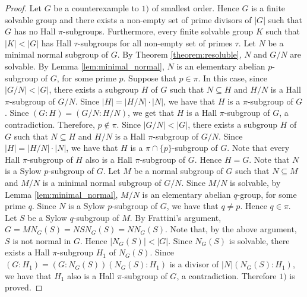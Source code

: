 \begin{proof}
    Let $G$ be a counterexample to $1)$ of smallest order. Hence $G$ is a finite solvable group and
    there exists a non-empty set of prime divisors of $|G|$ such that $G$ has no Hall $\pi$-subgroups. Furthermore, every finite solvable group $K$ such that $|K|<|G|$ has Hall $\tau$-subgroups for all non-empty set of primes $\tau$. Let $N$ be a minimal normal subgroup of $G$. By Theorem \ref{theorem:resoluble}, $N$ and $G/N$ are solvable. By Lemma \ref{lem:minimal_normal}, $N$ is an elementary abelian $p$-subgroup of $G$, for some prime $p$.
    Suppose that $p\in\pi$. In this case, since $|G/N|<|G|$, there exists a subgroup $H$ of $G$ such that $N\subseteq H$ and $H/N$ is a Hall $\pi$-subgroup
    of $G/N$. Since $|H|=|H/N|\cdot |N|$, we have that $H$ is a $\pi$-subgroup of $G$. Since $(G:H)=(G/N:H/N)$, we get that $H$ is a Hall $\pi$-subgroup of $G$, a contradiction. Therefore, $p\notin \pi$. Since $|G/N|<|G|$, there exists a subgroup $H$ of $G$ such that $N\subseteq H$ and $H/N$ is a Hall $\pi$-subgroup
    of $G/N$. Since $|H|=|H/N|\cdot |N|$, we have that $H$ is a $\pi\cap\{ p\}$-subgroup of $G$. Note that every Hall $\pi$-subgroup of $H$ also is a Hall $\pi$-subgroup of $G$. Hence $H=G$. Note that $N$ is a Sylow $p$-subgroup of $G$. Let $M$ be a normal subgroup of $G$ such that $N\subseteq M$ and $M/N$ is a minimal normal subgroup of $G/N$. Since $M/N$ is solvable, by Lemma \ref{lem:minimal_normal}, $M/N$ is an elementary abelian $q$-group, for some prime $q$. Since $N$ is a Sylow $p$-subgroup of $G$, we have that $q\neq p$. Hence $q\in \pi$. Let $S$ be a Sylow $q$-subgroup of $M$. By Frattini's argument, $G=MN_G(S)=NSN_G(S)=NN_G(S)$. Note that, by the above argument, $S$ is not normal in $G$. Hence $|N_G(S)|<|G|$. Since $N_G(S)$ is solvable, there exists a Hall $\pi$-subgroup $H_1$ of $N_G(S)$. Since $(G:H_1)=(G:N_G(S))(N_G(S):H_1)$ is a divisor of $|N|(N_G(S):H_1)$, we have that $H_1$ also is a Hall $\pi$-subgroup of $G$, a contradiction. Therefore $1)$ is proved.
    

\end{proof}
